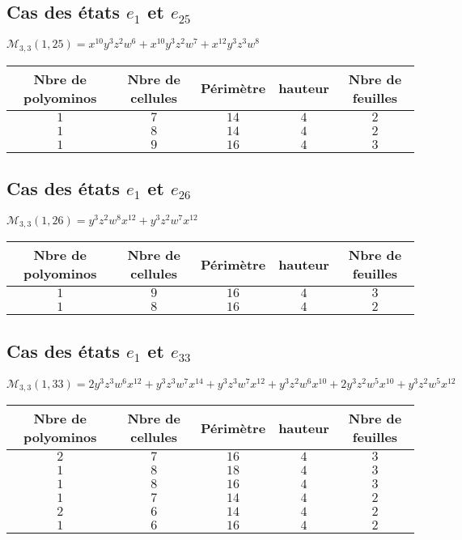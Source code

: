 \subsection*{Cas des états $e_{1}$ et $e_{25}$ }
$\mathcal{M}_{3,3}(1,25)=x^{10}y^3z^2w^6+x^{10}y^3z^2w^7+x^{12}y^3z^3w^8
$\\
\begin{tabular}{|c|c|c|c|c|}
 \hline
  Nbre de polyominos & Nbre de cellules & Périmètre & hauteur &Nbre de feuilles\\
 \hline
 $1$ & $7$ & $14$ & $4$ &$2$\\
 \hline
 $1$ & $8$ & $14$ & $4$ &$2$\\
 \hline
 $1$ & $9$ & $16$ & $4$ &$3$\\
 \hline
\end{tabular}
\subsection*{Cas des états $e_{1}$ et $e_{26}$ }
$\mathcal{M}_{3,3}(1,26)=y^3z^2w^8x^{12}+y^3z^2w^7x^{12}$\\
\begin{tabular}{|c|c|c|c|c|}
 \hline
  Nbre de polyominos & Nbre de cellules & Périmètre & hauteur &Nbre de feuilles\\
 \hline
 $1$ & $9$ & $16$ & $4$ &$3$\\
 \hline
 $1$ & $8$ & $16$ & $4$ &$2$\\
 \hline
\end{tabular}
\subsection*{Cas des états $e_{1}$ et $e_{33}$ }
$\mathcal{M}_{3,3}(1,33)=2y^3z^3w^6x^{12}+y^3z^3w^7x^{14}+y^3z^3w^7x^{12}+y^3z^2w^6x^{10}+2y^3z^2w^5x^{10}+y^3z^2w^5x^{12}
$\\
\begin{tabular}{|c|c|c|c|c|}
 \hline
  Nbre de polyominos & Nbre de cellules & Périmètre & hauteur &Nbre de feuilles\\
 \hline
 $2$ & $7$ & $16$ & $4$ &$3$\\
 \hline
 $1$ & $8$ & $18$ & $4$ &$3$\\
 \hline
 $1$ & $8$ & $16$ & $4$ &$3$\\
 \hline
 $1$ & $7$ & $14$ & $4$ &$2$\\
 \hline
 $2$ & $6$ & $14$ & $4$ &$2$\\
 \hline
 $1$ & $6$ & $16$ & $4$ &$2$\\
 \hline
\end{tabular}
